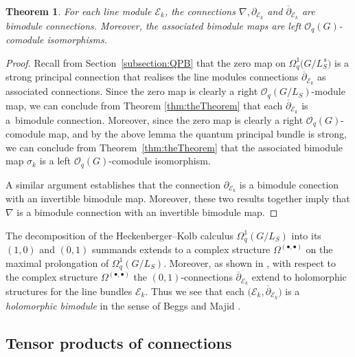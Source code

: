 \documentclass[10pt,a4paper]{amsart}
\numberwithin{equation}{section}
\newtheorem{Theorem}{Theorem}[section]
\newcommand\del{\partial}
\newcommand\adel{\overline{\partial}}
\begin{document}
\begin{Theorem}For each line module $\mathcal{E}_k$, the connections $\nabla, \partial_{\mathcal{E}_k}$ and $\overline{\partial}_{\mathcal{E}_k}$ are bimodule connections. Moreover, the associated bimodule maps are left $\mathcal{O}_q(G)$-comodule isomorphisms.
\end{Theorem}
\begin{proof}Recall from Section~\ref{subsection:QPB} that the zero map on $\Omega^1_q\big(G/L^{\,\mathrm{s}}_S\big)$ is a strong principal connection that realises the line modules connections $\adel_{\mathcal{E}_k}$ as associated connections. Since the zero map is clearly a right $\mathcal{O}_q(G/L_S)$-module map, we can conclude from Theorem \ref{thm:theTheorem} that each $\adel_{\mathcal{E}_k}$ is a~bimodule connection. Moreover, since the zero map is clearly a right $\mathcal{O}_q(G)$-comodule map, and by the above lemma the quantum principal bundle is strong, we can conclude from Theorem~\ref{thm:theTheorem} that the associated bimodule map $\sigma_k$ is a left $\mathcal{O}_q(G)$-comodule isomorphism.

A similar argument establishes that the connection $\del_{\mathcal{E}_k}$ is a bimodule conection with an invertible bimodule map. Moreover, these two results together imply that $\nabla$ is a bimodule connection with an invertible bimodule map.
\end{proof}

\begin{Remark}The decomposition of the Heckenberger--Kolb calculus $\Omega^1_q(G/L_S)$ into its $(1,0)$ and $(0,1)$ summands extends to a complex structure $\Omega^{(\bullet,\bullet)}$ on the maximal prolongation of $\Omega^1_q(G/L_S)$. Moreover, as shown in \cite[Theorem~4.5]{HVBQFM}, with respect to the complex structure $\Omega^{(\bullet,\bullet)}$ the $(0,1)$-connections $\adel_{\mathcal{E}_k}$ extend to holomorphic structures for the line bundles $\mathcal{E}_k$. Thus we see that each $\big(\mathcal{E}_k,\adel_{\mathcal{E}_k}\big)$ is a \emph{holomorphic bimodule} in the sense of Beggs and Majid \cite[Definition~7.14]{BeggsMajid:Leabh}.
\end{Remark}

\subsection{Tensor products of connections} \label{subsection:tensorprods}
\end{document}
